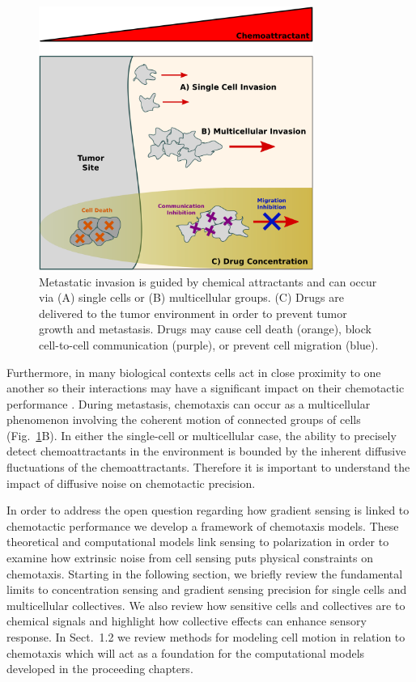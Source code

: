 \begin{figure}[ht]
    \centering
        \includegraphics[width=0.8\textwidth]{../fig/ch1_fig1.png}
    \caption{Metastatic invasion is guided by chemical attractants and can occur via (A) single cells or (B) multicellular groups. (C) Drugs are delivered to the tumor environment in order to prevent tumor growth and metastasis. Drugs may cause cell death (orange), block cell-to-cell communication (purple), or prevent cell migration (blue).}
\label{fig:ch1_1}
\end{figure}


Furthermore, in many biological contexts cells act in close proximity to one another so their interactions may have a significant impact on their chemotactic performance \cite{theveneau2010collective}. During metastasis, chemotaxis can occur as a multicellular phenomenon involving the coherent motion of connected groups of cells (Fig.\ \ref{fig:ch1_1}B). In either the single-cell or multicellular case, the ability to precisely detect chemoattractants in the environment is bounded by the inherent diffusive fluctuations of the chemoattractants. Therefore it is important to understand the impact of diffusive noise on chemotactic precision.

In order to address the open question regarding how gradient sensing is linked to chemotactic performance we develop a framework of chemotaxis models. These theoretical and computational models
link sensing to polarization in order to examine how extrinsic noise from cell sensing puts physical constraints on chemotaxis. Starting in the following section, we briefly review the fundamental limits to concentration sensing and gradient sensing precision for single cells and multicellular collectives.
We also review how sensitive cells and collectives are to chemical signals and highlight how collective effects can enhance sensory response.
In Sect.\ 1.2 we review methods for modeling cell motion in relation to chemotaxis which will act as a foundation for the computational models developed in the proceeding chapters.

